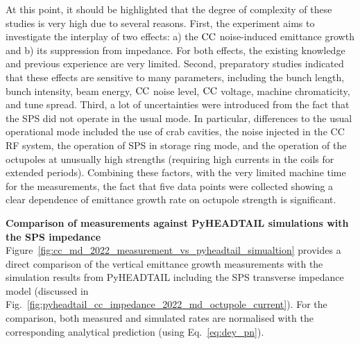 At this point, it should be highlighted that the degree of complexity of these studies is very high due to several reasons. First, the experiment aims to investigate the interplay of two effects: a) the ${\mathrm{CC}}$ noise-induced emittance growth and b) its suppression from impedance.  For both effects, the existing knowledge and previous experience are very limited. %
Second, preparatory studies indicated that these effects are sensitive to many parameters, including the bunch length, bunch intensity, beam energy, ${\mathrm{CC}}$ noise level, ${\mathrm{CC}}$ voltage, machine chromaticity, and tune spread. Third, a lot of uncertainties were introduced from the fact that the SPS did not operate in the usual mode. In particular, differences to the usual operational mode included the use of crab cavities, the noise injected in the CC RF system, the operation of SPS in storage ring mode, and the operation of the octupoles at unusually high strengths (requiring high currents in the coils for extended periods). %
Combining these factors, with the very limited machine time for the measurements, the fact that five data points were collected showing a clear dependence of emittance growth rate on octupole strength is significant.

\textbf{Comparison of measurements against PyHEADTAIL simulations with the SPS impedance}\\

Figure~\ref{fig:cc_md_2022_measurement_vs_pyheadtail_simualtion} provides a direct comparison of the vertical emittance growth measurements with the simulation results from PyHEADTAIL including the SPS transverse impedance model (discussed in Fig.~\ref{fig:pyheadtail_cc_impedance_2022_md_octupole_current}). For the comparison, both measured and simulated rates are normalised with the corresponding analytical prediction (using Eq.~\eqref{eq:dey_pn}). 

